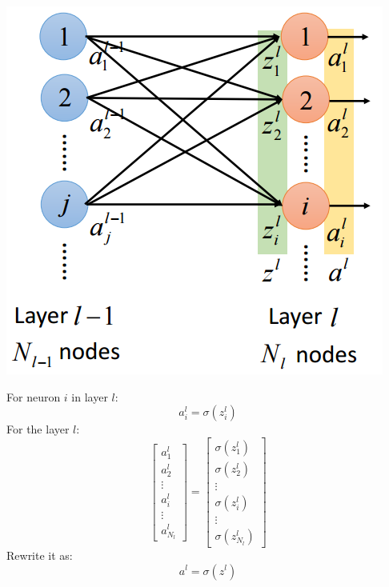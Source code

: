 \documentclass{article}
\begin{document}
\begin{center}
\includegraphics[scale=0.4]{layer_2}
\end{center}
For neuron $i$ in layer $l$:
\[
a^l_i = \sigma(z^l_i)
\]
For the layer $l$:
\[
\begin{bmatrix}
a^l_{1} \\ a^l_{2} \\ \vdots \\ a^l_{i} \\ \vdots  \\ a^l_{N_l}
\end{bmatrix}
=
\begin{bmatrix}
\sigma(z^l_1) \\ \sigma(z^l_2) \\ \vdots \\ \sigma(z^l_i) \\ \vdots  \\ \sigma(z^l_{N_l})
\end{bmatrix}
\]
Rewrite it as:
\[
a^l = \sigma(z^l)
\]
\end{document}
